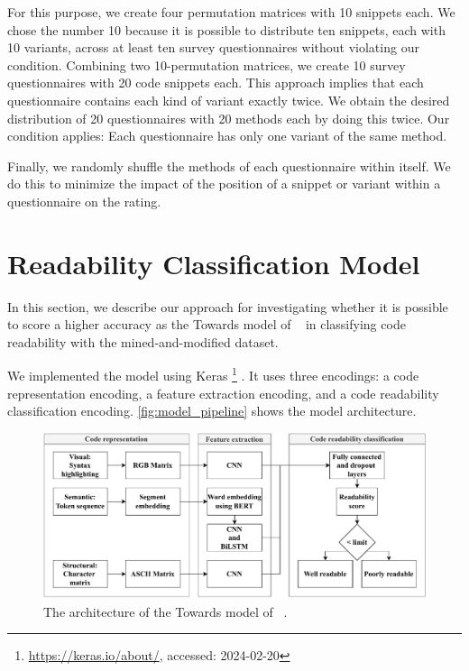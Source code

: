 \documentclass[%
class=scrreprt,
chapterprefix=false,%
open=right,%
twoside=true,%
paper=a4,%
logofile={Logo\_zentral\_farbig\_EN.png},%
thesistype=master,%
UKenglish,%
]{se2thesis}
\newcounter{urlfootnote}
\newcommand{\onecurl}[2]{%
	\stepcounter{urlfootnote}%
	\expandafter\def\csname urlfootnote:#1\endcsname{\theurlfootnote}%
	\footnote{\label{url:#1}\url{#1}, accessed: #2}%
}
\newcommand{\curl}[2]{%
		\onecurl{#1}{#2}%
}
\theoremstyle{definition}
\begin{document}
	For this purpose, we create four permutation matrices with 10 snippets each. We chose the number 10 because it is possible to distribute ten snippets, each with 10 variants, across at least ten survey questionnaires without violating our condition. Combining two 10-permutation matrices, we create 10 survey questionnaires with 20 code snippets each. This approach implies that each questionnaire contains each kind of variant exactly twice. We obtain the desired distribution of 20 questionnaires with 20 methods each by doing this twice. Our condition applies: Each questionnaire has only one variant of the same method.
		
	Finally, we randomly shuffle the methods of each questionnaire within itself. We do this to minimize the impact of the position of a snippet or variant within a questionnaire on the rating.
	
\section{Readability Classification Model} \label{Readability Classification Model}

	In this section, we describe our approach for investigating whether it is possible to score a higher accuracy as the Towards model of \citeauthor{mi2022towards}~\cite{mi2022towards} in classifying code readability with the mined-and-modified dataset.
    
	We implemented the model using Keras\curl{https://keras.io/about/}{2024-02-20}. It uses three encodings: a code representation encoding, a feature extraction encoding, and a code readability classification encoding. \autoref{fig:model_pipeline} shows the model architecture.
	
	\begin{figure}[tb]
		\centering
		\includegraphics[width=\textwidth]{img/model_pipline.pdf}
		\caption{The architecture of the Towards model of \citeauthor{mi2022towards}~\cite{mi2022towards}.}
		\label{fig:model_pipeline}
	\end{figure}
	
\end{document}
